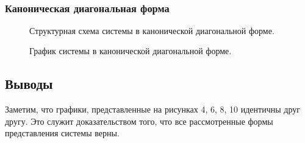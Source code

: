 \documentclass[a5paper, 10pt]{article}
\theoremstyle{definition}
\theoremstyle{plain}
\theoremstyle{remark}
\begin{document}
\newpage
\,
\newpage
\subsubsection{Каноническая диагональная форма}

\begin{figure}[h]
\caption{Структурная схема системы в канонической диагональной форме.}
\end{figure}

\begin{figure}[h]
\caption{График системы в канонической диагональной форме.}
\end{figure}

\newpage
\subsection{Выводы}
Заметим, что графики, представленные на рисунках 4, 6, 8, 10 идентичны друг другу. Это служит доказательством того, что все рассмотренные формы представления системы верны.
\end{document}
